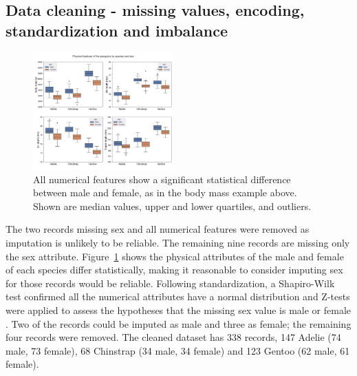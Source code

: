 \documentclass[a4paper, 11pt]{article}
\begin{document}
\vspace{\baselineskip}
\subsection*{Data cleaning - missing values, encoding, standardization and imbalance}

\begin{figure} %
  \centering
  \vspace{-1\baselineskip} %
  \includegraphics[width=0.48\textwidth]{sex.png} %
  \vspace{-0.5\baselineskip} %
  \caption{\centering\linespread{0.8}\selectfont All numerical features show a significant statistical difference between male and female, 
  as in the body mass example above. Shown are median values, upper and lower quartiles, 
  and outliers.}
  \vspace{-0.6\baselineskip} %
  \label{fig:sex}
\end{figure}   

The two records missing sex and all numerical features were removed as imputation is unlikely to be reliable. 
The remaining nine records are missing only the sex attribute. Figure~\ref{fig:sex} shows the physical 
attributes of the male and female of each species differ statistically, making it reasonable to 
consider imputing sex for those records would be reliable. Following standardization, 
a Shapiro-Wilk test confirmed all the numerical attributes have a normal distribution \cite{shapiro1965analysis} 
and Z-tests were applied to assess the 
hypotheses that the missing sex value is male or female \cite{freedman2007statistics}. 
Two of the records could be imputed as male and three as female; the remaining four records were removed. 
The cleaned dataset has 338 records, 147 Adelie  
(74 male, 73 female), 68 Chinstrap (34 male, 34 female) and 123 Gentoo (62 male, 61 female).
\end{document}
